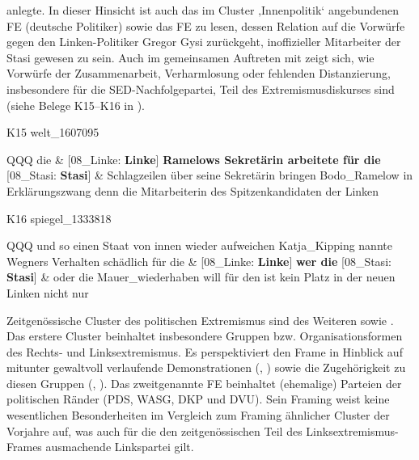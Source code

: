anlegte. In dieser Hinsicht ist auch das im Cluster ‚Innenpolitik` angebundenen FE  (deutsche Politiker) sowie das FE  zu lesen, dessen Relation auf die Vorwürfe gegen den Linken-Politiker Gregor Gysi zurückgeht, inoffizieller Mitarbeiter der Stasi gewesen zu sein. Auch im gemeinsamen Auftreten mit  zeigt sich, wie Vorwürfe der Zusammenarbeit, Verharmlosung oder fehlenden Distanzierung, insbesondere für die SED-Nachfolgepartei, Teil des Extremismusdiskurses sind (siehe Belege K15--K16 in ).

\begin{table}\small
  \caption{Konkordanzen zur Kollokation der Cluster  und .}
  \label{tab:K15-K16}
K15 welt\_1607095
\begin{tabularx}{\textwidth}{QQQ}
\toprule
die & {[}08\_Linke: \textbf{Linke}{]}\newline
\textbf{Ramelows Sekretärin arbeitete für die}\newline
{[}08\_Stasi: \textbf{Stasi}{]} & Schlagzeilen über seine Sekretärin bringen Bodo\_Ramelow in Erklärungszwang denn die Mitarbeiterin des Spitzenkandidaten der Linken \\
\bottomrule
\end{tabularx}
\bigskip \newline
K16 spiegel\_1333818
\begin{tabularx}{\textwidth}{QQQ}
\toprule
und so einen Staat von innen wieder aufweichen Katja\_Kipping nannte Wegners Verhalten schädlich für die & {[}08\_Linke: \textbf{Linke}{]}\newline
\textbf{wer die}\newline
{[}08\_Stasi: \textbf{Stasi}{]} & oder die Mauer\_wiederhaben will für den ist kein Platz in der neuen Linken nicht nur \\
\bottomrule
\end{tabularx}
\end{table}

Zeitgenössische Cluster des politischen Extremismus sind des Weiteren  sowie . Das erstere Cluster beinhaltet insbesondere Gruppen bzw. Organisationsformen des Rechts- und Linksextremismus. Es perspektiviert den Frame in Hinblick auf mitunter gewaltvoll verlaufende Demonstrationen (, ) sowie die Zugehörigkeit zu diesen Gruppen (, ). Das zweitgenannte FE beinhaltet (ehemalige) Parteien der politischen Ränder (PDS, WASG, DKP und DVU). Sein Framing weist keine wesentlichen Besonderheiten im Vergleich zum Framing ähnlicher Cluster der Vorjahre auf, was auch für die den zeitgenössischen Teil des Linksextremismus-Frames ausmachende Linkspartei gilt.

